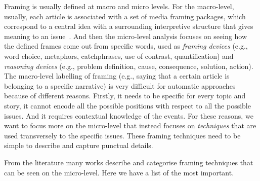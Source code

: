 Framing is usually defined at macro and micro levels.
For the macro-level, usually, each article is associated with a set of media framing packages, which correspond to a central idea with a surrounding interpretive structure that gives meaning to an issue~\cite{gamson1989media}.
And then the micro-level analysis focuses on seeing how the defined frames come out from specific words, used as \textit{framing devices} (e.g., word choice, metaphors, catchphrases, use of contrast, quantification) and \textit{reasoning devices} (e.g., problem definition, cause, consequence, solution, action).
The macro-level labelling of framing (e.g., saying that a certain article is belonging to a specific narrative) is very difficult for automatic approaches because of different reasons. Firstly, it needs to be specific for every topic and story, it cannot encode all the possible positions with respect to all the possible issues. And it requires contextual knowledge of the events.
For these reasons, we want to focus more on the micro-level that instead focuses on \emph{techniques} that are used transversely to the specific issues. These framing techniques need to be simple to describe and capture punctual details.

From the literature many works describe and categorise framing techniques that can be seen on the micro-level. Here we have a list of the most important.


